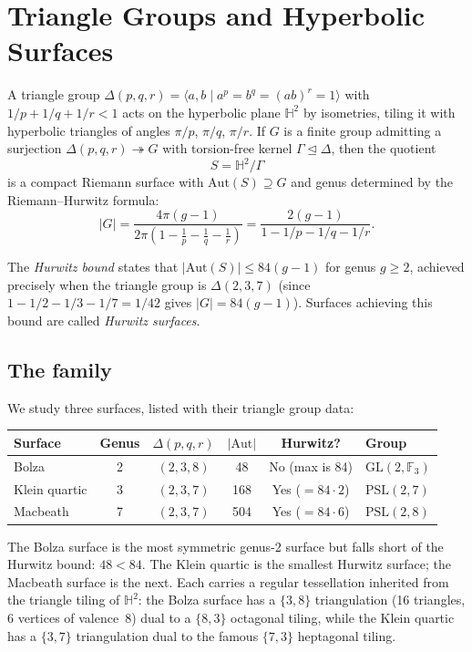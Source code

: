\documentclass[11pt,a4paper]{article}
\begin{document}
\section{Triangle Groups and Hyperbolic Surfaces}

A triangle group $\Delta(p,q,r) = \langle a, b \mid a^p = b^q = (ab)^r = 1 \rangle$
with $1/p + 1/q + 1/r < 1$ acts on the hyperbolic plane $\mathbb{H}^2$ by
isometries, tiling it with hyperbolic triangles of angles $\pi/p$, $\pi/q$,
$\pi/r$. If $G$ is a finite group admitting a surjection
$\Delta(p,q,r) \twoheadrightarrow G$ with torsion-free kernel
$\Gamma \trianglelefteq \Delta$, then the quotient
\[
  S = \mathbb{H}^2 / \Gamma
\]
is a compact Riemann surface with $\mathrm{Aut}(S) \supseteq G$ and genus
determined by the Riemann--Hurwitz formula:
\[
  |G| = \frac{4\pi(g - 1)}{2\pi\left(1 - \frac{1}{p} - \frac{1}{q} - \frac{1}{r}\right)}
  = \frac{2(g-1)}{1 - 1/p - 1/q - 1/r}.
\]

The \emph{Hurwitz bound} states that $|\mathrm{Aut}(S)| \leq 84(g-1)$ for
genus $g \geq 2$, achieved precisely when the triangle group is $\Delta(2,3,7)$
(since $1 - 1/2 - 1/3 - 1/7 = 1/42$ gives $|G| = 84(g-1)$). Surfaces
achieving this bound are called \emph{Hurwitz surfaces}.

\subsection{The family}

We study three surfaces, listed with their triangle group data:

\medskip
\begin{center}
\renewcommand{\arraystretch}{1.3}
\begin{tabular}{@{}lccccl@{}}
\toprule
\textbf{Surface} & \textbf{Genus} & $\Delta(p,q,r)$ & $|\mathrm{Aut}|$
  & \textbf{Hurwitz?} & \textbf{Group} \\
\midrule
Bolza & 2 & $(2,3,8)$ & 48 & No (max is 84) & $\mathrm{GL}(2, \mathbb{F}_3)$ \\
Klein quartic & 3 & $(2,3,7)$ & 168 & Yes ($= 84 \cdot 2$) & $\mathrm{PSL}(2,7)$ \\
Macbeath & 7 & $(2,3,7)$ & 504 & Yes ($= 84 \cdot 6$) & $\mathrm{PSL}(2,8)$ \\
\bottomrule
\end{tabular}
\end{center}

\medskip
The Bolza surface is the most symmetric genus-2 surface but falls short of the
Hurwitz bound: $48 < 84$. The Klein quartic is the smallest Hurwitz surface;
the Macbeath surface is the next. Each carries a regular tessellation inherited
from the triangle tiling of $\mathbb{H}^2$: the Bolza surface has a
$\{3,8\}$ triangulation (16 triangles, 6 vertices of valence~8) dual to a
$\{8,3\}$ octagonal tiling, while the Klein quartic has a $\{3,7\}$
triangulation dual to the famous $\{7,3\}$ heptagonal tiling.
\end{document}
